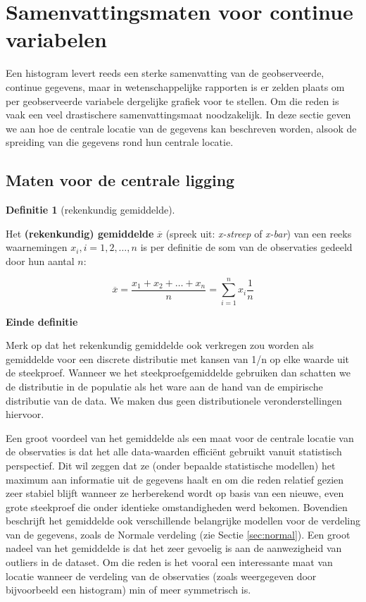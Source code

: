 \documentclass[
  12pt,dutch,coursenotes]{book}
\theoremstyle{definition}
\newtheorem{definition}{Definitie}[chapter]
\theoremstyle{definition}
\theoremstyle{definition}
\theoremstyle{definition}
\theoremstyle{remark}
\begin{document}
\hypertarget{sec:summarize}{%
\section{Samenvattingsmaten voor continue variabelen}\label{sec:summarize}}

Een histogram levert reeds een sterke samenvatting van de geobserveerde,
continue gegevens, maar in wetenschappelijke rapporten is er zelden
plaats om per geobserveerde variabele dergelijke grafiek voor te stellen. Om
die reden is vaak een veel drastischere samenvattingsmaat noodzakelijk. In deze
sectie geven we aan hoe de centrale locatie van de gegevens kan beschreven
worden, alsook de spreiding van die gegevens rond hun centrale locatie.

\hypertarget{maten-voor-de-centrale-ligging}{%
\subsection{Maten voor de centrale ligging}\label{maten-voor-de-centrale-ligging}}

\begin{definition}[rekenkundig gemiddelde]
\protect\hypertarget{def:unnamed-chunk-93}{}{\label{def:unnamed-chunk-93} {} }
\end{definition}
Het \textbf{(rekenkundig) gemiddelde} \(\overline{x}\) (spreek uit: \emph{x-streep}
of \emph{x-bar}) van een reeks waarnemingen \(x_i, i=1, 2, \dots, n\) is per
definitie de som van de observaties gedeeld door hun aantal \(n\):

\[\overline{x}= \frac{x_1 + x_2 + \dots + x_n}{n} =\sum_{i=1}^n x_i \frac{1}{n} \]

\textbf{Einde definitie}

Merk op dat het rekenkundig gemiddelde ook verkregen zou worden als gemiddelde voor een discrete distributie met kansen van 1/n op elke waarde uit de steekproef.
Wanneer we het steekproefgemiddelde gebruiken dan schatten we de distributie in de populatie als het ware aan de hand van de empirische distributie van de data. We maken dus geen distributionele veronderstellingen hiervoor.

Een groot voordeel van het gemiddelde als een maat voor de centrale locatie
van de observaties is dat het alle data-waarden efficiënt gebruikt vanuit
statistisch perspectief. Dit wil zeggen dat ze (onder bepaalde statistische modellen)
het maximum aan informatie
uit de gegevens haalt en om die reden relatief gezien zeer stabiel blijft
wanneer ze herberekend wordt op basis van een nieuwe, even grote steekproef
die onder identieke omstandigheden werd bekomen. Bovendien beschrijft het
gemiddelde ook verschillende belangrijke modellen voor de verdeling van de
gegevens, zoals de Normale verdeling (zie Sectie \ref{sec:normal}). Een
groot nadeel van het gemiddelde is dat het zeer gevoelig is aan de
aanwezigheid van outliers in de dataset. Om die reden is het vooral een
interessante maat van locatie wanneer de verdeling van de observaties (zoals
weergegeven door bijvoorbeeld een histogram) min of meer symmetrisch is.
\end{document}
